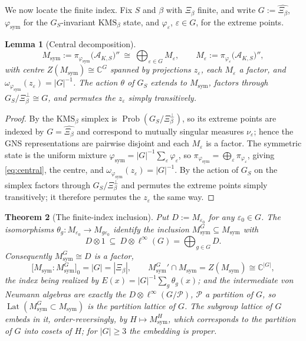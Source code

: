\documentclass[11pt]{amsart}
\numberwithin{equation}{section}
\newtheorem{theorem}{Theorem}[section]
\newtheorem{lemma}[theorem]{Lemma}
\theoremstyle{definition}
\theoremstyle{remark}
\newcommand{\C}{\mathbb{C}}
\newcommand{\cA}{\mathcal{A}}
\newcommand{\Prob}{\operatorname{Prob}}
\newcommand{\Lat}{\operatorname{Lat}}
\newcommand{\Msym}{M_{\mathrm{sym}}}
\newcommand{\phisym}{\varphi_{\mathrm{sym}}}
\begin{document}
We now locate the finite index. Fix $S$ and $\beta$ with $\Xi_\beta$ finite, and write
$G:=\widehat{\Xi_\beta}$, $\phisym$ for the $G_S$-invariant $\mathrm{KMS}_\beta$ state, and
$\varphi_\varepsilon$, $\varepsilon\in G$, for the extreme points.

\begin{lemma}[Central decomposition]\label{lem:central}
\begin{equation}\label{eq:central}
\Msym:=\pi_{\phisym}\bigl(\cA_{K,S}\bigr)''\ \cong\ \bigoplus_{\varepsilon\in G}M_\varepsilon,
\qquad M_\varepsilon:=\pi_{\varphi_\varepsilon}\bigl(\cA_{K,S}\bigr)'' ,
\end{equation}
with centre $Z(\Msym)\cong\C^{G}$ spanned by projections $z_\varepsilon$, each
$M_\varepsilon$ a factor, and $\omega_{\phisym}(z_\varepsilon)=|G|^{-1}$. The action
$\theta$ of $G_S$ extends to $\Msym$, factors through
$G_S/\Xi_\beta^\perp\cong G$, and permutes the $z_\varepsilon$ simply transitively.
\end{lemma}

\begin{proof}
By \cite[Thm.~3.6]{Main} the $\mathrm{KMS}_\beta$ simplex is $\Prob(G_S/\Xi_\beta^\perp)$,
so its extreme points are indexed by $G=\widehat{\Xi_\beta}$ and correspond to mutually
singular measures $\nu_\varepsilon$; hence the GNS representations are pairwise disjoint and
each $M_\varepsilon$ is a factor. The symmetric state is the uniform mixture
$\phisym=|G|^{-1}\sum_\varepsilon\varphi_\varepsilon$, so
$\pi_{\phisym}=\bigoplus_\varepsilon\pi_{\varphi_\varepsilon}$, giving \eqref{eq:central},
the centre, and $\omega_{\phisym}(z_\varepsilon)=|G|^{-1}$. By \cite[Thm.~3.6(3)]{Main} the
action of $G_S$ on the simplex factors through $G_S/\Xi_\beta^\perp$ and permutes the
extreme points simply transitively; it therefore permutes the $z_\varepsilon$ the same way.
\end{proof}

\begin{theorem}[The finite-index inclusion]\label{thm:finite}
Put $D:=M_{\varepsilon_0}$ for any $\varepsilon_0\in G$. The isomorphisms
$\theta_g:M_{\varepsilon_0}\to M_{g\varepsilon_0}$ identify the inclusion
$\Msym^{G}\subseteq\Msym$ with
\begin{equation}\label{eq:trivialincl}
D\otimes1\ \subseteq\ D\otimes\ell^\infty(G)=\bigoplus_{g\in G}D .
\end{equation}
Consequently $\Msym^G\cong D$ is a factor,
\begin{equation}\label{eq:index}
\bigl[\Msym:\Msym^{G}\bigr]_0=|G|=|\Xi_\beta|,
\qquad
\Msym^{G}{}'\cap\Msym=Z(\Msym)\cong\C^{|G|},
\end{equation}
the index being realized by $E(x)=|G|^{-1}\sum_{g}\theta_g(x)$; and the intermediate von
Neumann algebras are exactly the $D\otimes\ell^\infty(G/\mathcal P)$, $\mathcal P$ a
partition of $G$, so $\Lat(\Msym^G\subset\Msym)$ is the partition lattice of $G$. The
subgroup lattice of $G$ embeds in it, order-reversingly, by $H\mapsto\Msym^H$, which
corresponds to the partition of $G$ into cosets of $H$; for $|G|\ge3$ the embedding is
proper.
\end{theorem}
\end{document}
